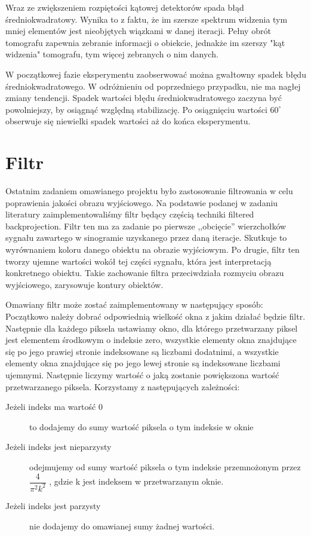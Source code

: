 \documentclass{article}
\begin{document}
Wraz ze zwiększeniem rozpiętości kątowej detektorów spada błąd średniokwadratowy. Wynika to z  faktu, że im szersze spektrum widzenia tym mniej elementów jest nieobjętych wiązkami w danej iteracji. Pełny obrót tomografu zapewnia zebranie informacji o obiekcie, jednakże im szerszy "kąt widzenia" tomografu, tym więcej zebranych o nim danych.

W początkowej fazie eksperymentu zaobserwować można gwałtowny spadek błędu średniokwadratowego. W odróżnieniu od poprzedniego przypadku, nie ma nagłej zmiany tendencji. Spadek wartości błędu średniokwadratowego zaczyna być powolniejszy, by osiągnąć względną stabilizację. Po osiągnięciu wartości $60^{\circ}$ obserwuje się niewielki spadek wartości aż do końca eksperymentu.

\section{Filtr}

Ostatnim zadaniem omawianego projektu było zastosowanie filtrowania w celu poprawienia jakości obrazu wyjściowego. Na podstawie podanej w zadaniu literatury zaimplementowaliśmy filtr będący częścią techniki filtered backprojection. Filtr ten ma za zadanie po pierwsze  ,,obcięcie'' wierzchołków sygnału zawartego w sinogramie uzyskanego przez daną iteracje. Skutkuje to wyrównaniem koloru danego obiektu na obrazie wyjściowym. Po drugie, filtr ten tworzy ujemne wartości wokół tej części sygnału, która jest interpretacją konkretnego obiektu. Takie zachowanie filtra przeciwdziała rozmyciu obrazu wyjściowego, zarysowuje kontury obiektów.

Omawiany filtr może zostać zaimplementowany w następujący sposób: Początkowo należy dobrać odpowiednią wielkość okna z jakim działać będzie filtr. Następnie dla każdego piksela ustawiamy okno, dla którego przetwarzany piksel jest elementem środkowym o indeksie zero, wszystkie elementy okna znajdujące się po jego prawiej stronie indeksowane są liczbami dodatnimi, a wszystkie elementy okna znajdujące się po jego lewej stronie są indeksowane liczbami ujemnymi. Następnie liczymy wartość o jaką zostanie powiększona wartość przetwarzanego piksela. Korzystamy z następujących zależności:

\begin{description}
\item[Jeżeli indeks ma wartość 0] to dodajemy do sumy wartość piksela o tym indeksie w oknie
\item[Jeżeli indeks jest nieparzysty] odejmujemy od sumy wartość piksela o tym indeksie przemnożonym przez $\dfrac{4}{\pi^2 k^2}$ , gdzie k jest indeksem w przetwarzanym oknie. 
\item[Jeżeli indeks jest parzysty] nie dodajemy do omawianej sumy żadnej wartości.\end{description}
\end{document}
